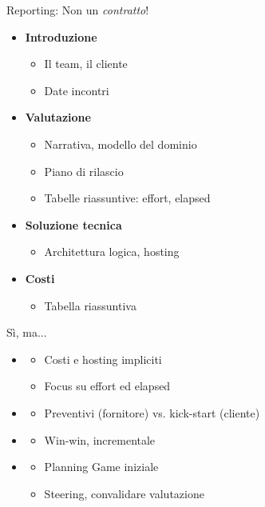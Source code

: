 	\begin{frame}{Reporting: Non un \emph{contratto}!}
		\begin{itemize}
			\item \textbf{Introduzione}
			\begin{itemize}
				\item Il team, il cliente
				\item Date incontri
			\end{itemize}

			\item \textbf{Valutazione}
			\begin{itemize}
				\item Narrativa, modello del dominio
				\item Piano di rilascio
				\item Tabelle riassuntive: effort, elapsed
			\end{itemize}

			\item \textbf{Soluzione tecnica}
			\begin{itemize}
				\item Architettura logica, hosting
			\end{itemize}

			\item \textbf{Costi}
			\begin{itemize}
				\item Tabella riassuntiva
			\end{itemize}
		\end{itemize}
	\end{frame}
	
	\begin{frame}{Sì, ma...}
		\begin{itemize}
			\item {}
				\begin{itemize}
					\item Costi e hosting impliciti
					\item Focus su effort ed elapsed
				\end{itemize}
			\item {}
				\begin{itemize}
					\item Preventivi (fornitore) vs. kick-start (cliente)
				\end{itemize}
			\item {}
				\begin{itemize}
					\item Win-win, incrementale
				\end{itemize}
			\item {}
				\begin{itemize}
					\item Planning Game iniziale
					\item Steering, convalidare valutazione
				\end{itemize}
		\end{itemize}
	\end{frame}

